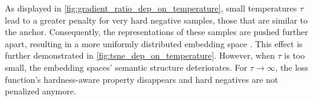 As displayed in \autoref{fig:gradient_ratio_dep_on_temperature}, 
small temperatures $\tau$ lead to a greater penalty for very hard negative samples, those that are similar to the anchor.
Consequently, the representations of these samples are pushed further apart, 
resulting in a more uniformly distributed embedding space \citep{CL_temp_2021,grape_2024}. 
This effect is further demonstrated in \autoref{fig:tsne_dep_on_temperature}.
However, when $\tau$ is too small, the embedding spaces' semantic structure deteriorates.
For $\tau \rightarrow \infty$, the loss function's hardness-aware property disappears and hard negatives are not penalized anymore.